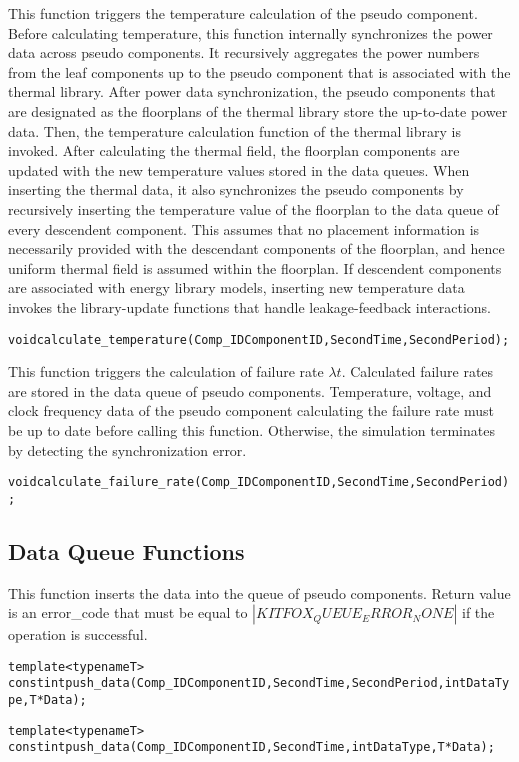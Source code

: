 \noindent
This function triggers the temperature calculation of the pseudo component. 
Before calculating temperature, this function internally synchronizes the power data across pseudo components.
It recursively aggregates the power numbers from the leaf components up to the pseudo component that is associated with the thermal library.
After power data synchronization, the pseudo components that are designated as the floorplans of the thermal library store the up-to-date power data.
Then, the temperature calculation function of the thermal library is invoked.
After calculating the thermal field, the floorplan components are updated with the new temperature values stored in the data queues.
When inserting the thermal data, it also synchronizes the pseudo components by recursively inserting the temperature value of the floorplan to the data queue of every descendent component.
This assumes that no placement information is necessarily provided with the descendant components of the floorplan, and hence uniform thermal field is assumed within the floorplan.
If descendent components are associated with energy library models, inserting new temperature data invokes the library-update functions that handle leakage-feedback interactions.
{
\fontsize{10pt}{11pt}\selectfont
\begin{alltt}
void calculate_temperature(Comp_ID ComponentID, Second Time, Second Period);
\end{alltt}
}

\noindent
This function triggers the calculation of failure rate $\lambda t$. 
Calculated failure rates are stored in the data queue of pseudo components. 
Temperature, voltage, and clock frequency data of the pseudo component calculating the failure rate must be up to date before calling this function. 
Otherwise, the simulation terminates by detecting the synchronization error.
{
\fontsize{10pt}{11pt}\selectfont
\begin{alltt}
void calculate_failure_rate(Comp_ID ComponentID, Second Time, Second Period);
\end{alltt}
}

\subsection{Data Queue Functions} \label{subsec:data_queue_functions}
\noindent
This function inserts the data into the queue of pseudo components. 
Return value is an error\_code that must be equal to $|KITFOX_QUEUE_ERROR_NONE|$ if the operation is successful.
{
\fontsize{10pt}{11pt}\selectfont
\begin{alltt}
template <typename T>
const int push_data(Comp_ID ComponentID, Second Time, Second Period, int DataType, T *Data);

template <typename T>
const int push_data(Comp_ID ComponentID, Second Time, int DataType, T *Data);
\end{alltt}
}

